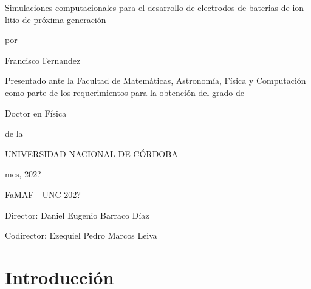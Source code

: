 \documentclass[12pt,spanish,a4paper,twoside]{book}
\newcommand\blankpage{%
    \null
    \thispagestyle{empty}%
    \addtocounter{page}{-1}%
    \newpage
}
\begin{document}
\frontmatter

\blankpage
\blankpage

\thispagestyle{empty}
\begin{center}
{\large

    \vspace{1cm}

    {\Huge Simulaciones computacionales para el desarrollo de electrodos de 
            baterias de ion-litio de próxima generación}
    
    \vspace{0.5cm}
    por
    \vspace{0.5cm}
    
    {\Large Francisco Fernandez}

    \vspace{0.5cm}

    Presentado ante la Facultad de Matemáticas, Astronomía, Física y Computación 
    como parte de los requerimientos para la obtención del grado de
    
    \vspace{0.5cm}

    {\Large Doctor en Física}

    \vspace{0.5cm}
    de la

    UNIVERSIDAD NACIONAL DE CÓRDOBA

    \vspace{0.5cm}
    
    mes, 202?

    \textcopyright FaMAF - UNC 202?

    \vspace{1.5cm}

    Director: Daniel Eugenio Barraco Díaz

    Codirector: Ezequiel Pedro Marcos Leiva

}
\end{center}


\tableofcontents
\listoffigures



\mainmatter


\chapter[Introducción]{Introducción}
\thispagestyle{empty}
\end{document}
